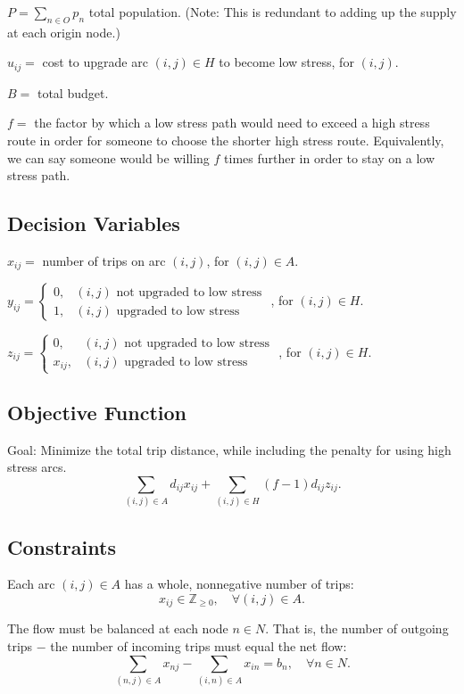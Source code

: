 \documentclass[12pt,letterpaper]{article}
\newcommand{\Z}{\mathbb{Z}}
\begin{document}
$P=\sum_{n\in O} p_n$ total population. (Note: This is redundant to adding up the supply at each origin node.)

$u_{ij}=$ cost to upgrade arc $(i,j)\in H$ to become low stress, for $(i,j)$.

$B=$ total budget.

$f=$ the factor by which a low stress path would need to exceed a high stress route in order for someone to choose the shorter high stress route. Equivalently, we can say someone would be willing $f$ times further in order to stay on a low stress path. 

\subsection{Decision Variables}

$x_{ij}=$ number of trips on arc $(i,j)$, for $(i,j)\in A$. 

$y_{ij}=\left\{\begin{array}{ll}
    0, & (i,j) \mbox{ not upgraded to low stress} \\
    1, & (i,j) \mbox{ upgraded to low stress}
\end{array}\right. $ , for $(i,j)\in H$. 

$z_{ij}=\left\{\begin{array}{ll}
    0, & (i,j) \mbox{ not upgraded to low stress} \\
    x_{ij}, & (i,j) \mbox{ upgraded to low stress}
\end{array}\right. $ , for $(i,j)\in H$. 

\subsection{Objective Function}

Goal: Minimize the total trip distance, while including the penalty for using high stress arcs. 
\[ \sum_{(i,j)\in A} d_{ij}x_{ij} + \sum_{(i,j)\in H} (f-1)d_{ij}z_{ij} .\]

\subsection{Constraints}

Each arc $(i,j)\in A$ has a whole, nonnegative number of trips:
\[ x_{ij}\in\Z_{\geq0} , \quad \forall (i,j)\in A. \]

The flow must be balanced at each node $n\in N$. That is, the number of outgoing trips $-$ the number of incoming trips must equal the net flow:
\[ \sum_{(n,j)\in A} x_{nj} - \sum_{(i,n)\in A} x_{in} = b_n , \quad \forall n\in N.\]
\end{document}
